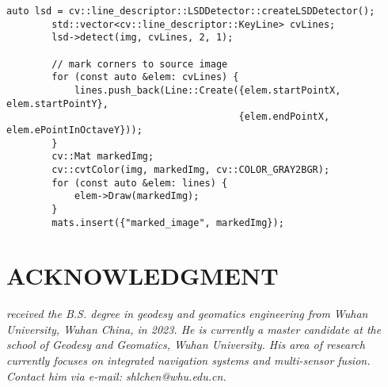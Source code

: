 \documentclass[12pt, onecolumn]{article}
\newcommand\normf{\fangsong}
\begin{document}
	\begin{lstlisting}[caption={\normf LSD直线提取代码}]
	    auto lsd = cv::line_descriptor::LSDDetector::createLSDDetector();
	    std::vector<cv::line_descriptor::KeyLine> cvLines;
	    lsd->detect(img, cvLines, 2, 1);
	
	    // mark corners to source image
	    for (const auto &elem: cvLines) {
	        lines.push_back(Line::Create({elem.startPointX, elem.startPointY},
	                                     {elem.endPointX, elem.ePointInOctaveY}));
	    }
	    cv::Mat markedImg;
	    cv::cvtColor(img, markedImg, cv::COLOR_GRAY2BGR);
	    for (const auto &elem: lines) {
	        elem->Draw(markedImg);
	    }
	    mats.insert({"marked_image", markedImg});
	\end{lstlisting}
	
		\newpage
		\section{ACKNOWLEDGMENT}
		\begin{tcolorbox}[colback=white,colframe=white!70!black,title={\bfseries Author Information}]
		\par\noindent
			\parbox[t]{\linewidth}{
		 \noindent{}
		 \emph{
		 received the B.S. degree in geodesy and geomatics engineering from Wuhan University, Wuhan China, in 2023.
		 He is currently a master candidate at the school of Geodesy and Geomatics, Wuhan University. His area of research currently focuses on integrated navigation systems and multi-sensor fusion.
		 Contact him via e-mail: shlchen@whu.edu.cn.
		 }}
		\end{tcolorbox}
\end{document}
